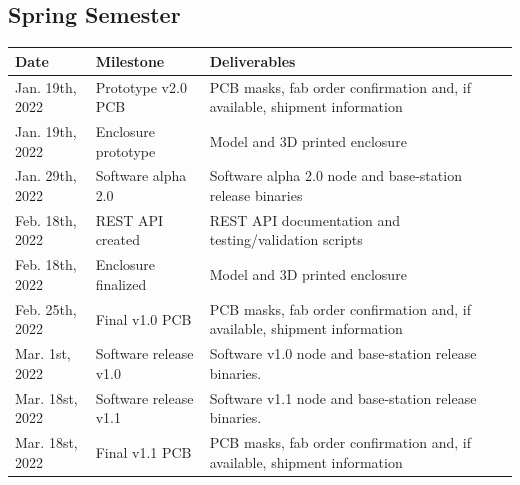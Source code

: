 \documentclass[titlepage, 11pt, letterpaper]{article}
\begin{document}
\subsection{Spring Semester}
%
%
\begin{table}[H]
    \begin{tabularx}{\linewidth}{|X|X|X|}
        \hline
        Date & Milestone & Deliverables \\
        \hline\hline
        Jan. 19th, 2022 
        & Prototype v2.0 PCB 
        & PCB masks, fab order confirmation and, if available, shipment information \\
        
        \hline
        Jan. 19th, 2022
        & Enclosure prototype
        & Model and 3D printed enclosure
        \\
        
        \hline
        Jan. 29th, 2022 
        & Software alpha 2.0 
        & Software alpha 2.0 node and base-station release binaries
        \\
        
        \hline
        Feb. 18th, 2022
        & REST API created
        & REST API documentation and testing/validation scripts
        \\
        
        \hline
        Feb. 18th, 2022
        & Enclosure finalized
        & Model and 3D printed enclosure
        \\
        
        \hline
        Feb. 25th, 2022
        & Final v1.0 PCB
        & PCB masks, fab order confirmation and, if available, shipment information 
        \\
        
        \hline
        Mar. 1st, 2022
        & Software release v1.0
        & Software v1.0 node and base-station release binaries. 
        \\ 
        
        \hline
        Mar. 18st, 2022
        & Software release v1.1
        & Software v1.1 node and base-station release binaries. 
        \\ 
        
        \hline
        Mar. 18st, 2022
        & Final v1.1 PCB
        & PCB masks, fab order confirmation and, if available, shipment information 
        \\
        

\end{tabularx}
\end{table}
\end{document}
